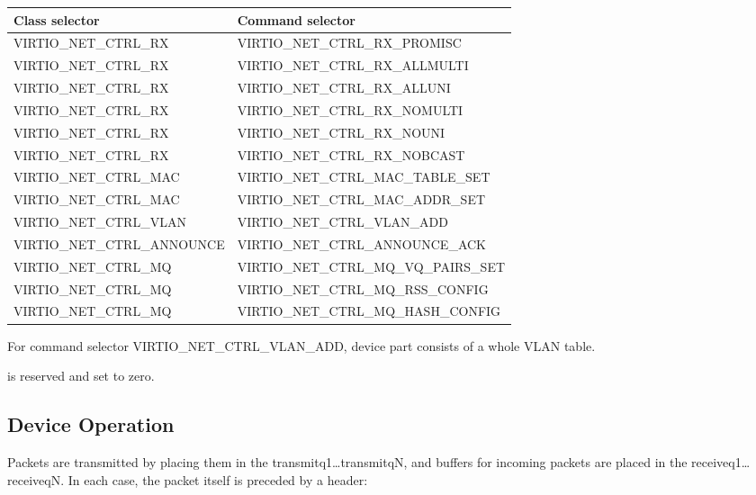 \begin{tabularx}{\textwidth}{ |l|X| }
\hline
Class selector & Command selector \\
\hline \hline
VIRTIO_NET_CTRL_RX & VIRTIO_NET_CTRL_RX_PROMISC \\
\hline
VIRTIO_NET_CTRL_RX & VIRTIO_NET_CTRL_RX_ALLMULTI \\
\hline
VIRTIO_NET_CTRL_RX & VIRTIO_NET_CTRL_RX_ALLUNI \\
\hline
VIRTIO_NET_CTRL_RX & VIRTIO_NET_CTRL_RX_NOMULTI \\
\hline
VIRTIO_NET_CTRL_RX & VIRTIO_NET_CTRL_RX_NOUNI \\
\hline
VIRTIO_NET_CTRL_RX & VIRTIO_NET_CTRL_RX_NOBCAST \\
\hline
VIRTIO_NET_CTRL_MAC & VIRTIO_NET_CTRL_MAC_TABLE_SET \\
\hline
VIRTIO_NET_CTRL_MAC & VIRTIO_NET_CTRL_MAC_ADDR_SET \\
\hline
VIRTIO_NET_CTRL_VLAN & VIRTIO_NET_CTRL_VLAN_ADD \\
\hline
VIRTIO_NET_CTRL_ANNOUNCE & VIRTIO_NET_CTRL_ANNOUNCE_ACK \\
\hline
VIRTIO_NET_CTRL_MQ & VIRTIO_NET_CTRL_MQ_VQ_PAIRS_SET \\
\hline
VIRTIO_NET_CTRL_MQ & VIRTIO_NET_CTRL_MQ_RSS_CONFIG \\
\hline
VIRTIO_NET_CTRL_MQ & VIRTIO_NET_CTRL_MQ_HASH_CONFIG \\
\hline
\hline
\end{tabularx}

For command selector VIRTIO_NET_CTRL_VLAN_ADD, device part consists of a whole
VLAN table.

 is reserved and set to zero.

\subsection{Device Operation}\label{sec:Device Types / Network Device / Device Operation}

Packets are transmitted by placing them in the
transmitq1\ldots transmitqN, and buffers for incoming packets are
placed in the receiveq1\ldots receiveqN. In each case, the packet
itself is preceded by a header:

